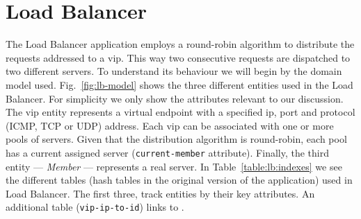 \documentclass[12pt,openright,twoside]{report}
\begin{document}


\section{Load Balancer}
\label{sec:feasibility:lb}
\glsresetall
The Load Balancer application employs a round-robin algorithm to distribute the requests addressed to a \gls{vip}. This way two consecutive requests are dispatched to two different servers. 
To understand its behaviour we will begin by the domain model used. Fig.~\ref{fig:lb-model} shows the three different entities used in the Load Balancer. For simplicity we only show the attributes relevant to our discussion.
The \gls{vip} entity represents a virtual endpoint with a specified \gls{ip}, port and protocol (ICMP, TCP or UDP) address. 
Each \gls{vip} can be associated with one or more pools of servers. Given that the distribution algorithm is round-robin, each pool has a current assigned server (\texttt{current-member} attribute). Finally, the third entity --- \emph{Member} --- represents a real server. 
In Table~\ref{table:lb:indexes} we see the different tables (hash tables in the original version of the application) used in Load Balancer.
The first three, track entities by their key attributes. An additional table (\texttt{vip-ip-to-id})  links   to . 

\begin{figure}[ht]
\TopFloatBoxes
\begin{floatrow}


\end{floatrow}
\end{figure}
\end{document}
